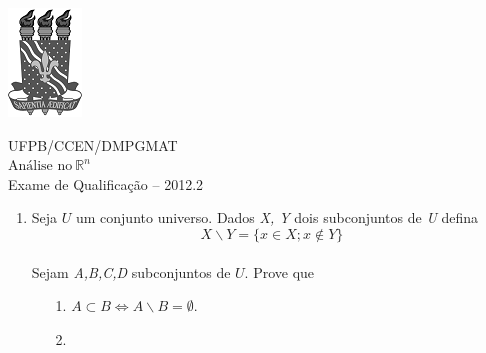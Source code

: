 \documentclass[11pt]{report}
\begin{document}
		\thispagestyle{empty}
	
	\noindent
	\begin{minipage}[c]{0.2\linewidth}
		\includegraphics{sm-ufpb-logo.png}
	\end{minipage} %
	\begin{minipage}[c]{0.7\linewidth}
		\begin{center}
			UFPB/CCEN/DMPGMAT \\
			$\mbox{Análise no} \ \mathbb{R}^{n}$ \\
			Exame de Qualificação -- 2012.2
		\end{center}
	\end{minipage}
	
	\vspace{0.8cm}
	
	\begin{enumerate}
		\item Seja $U$ um conjunto universo. Dados \textit{X, Y} dois subconjuntos de \textit {U} defina \\
		$$X \backslash Y = \{x \in X; x \notin Y\}$$ \\
		Sejam \textit{A,B,C,D} subconjuntos de $U$. Prove que \\
		\begin{enumerate}
		\item[1.] $A \subset B \Longleftrightarrow A \backslash B = \emptyset $.
		\item[2.]
		\end{enumerate}
	\end{enumerate}
	
\end{document}
